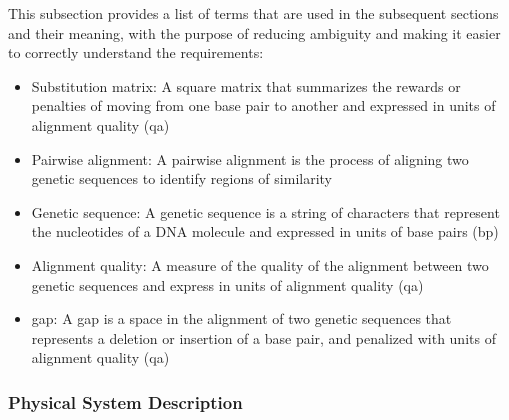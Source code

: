\documentclass[12pt]{article}
\begin{document}
This subsection provides a list of terms that are used in the subsequent
sections and their meaning, with the purpose of reducing ambiguity and making it
easier to correctly understand the requirements:

\begin{itemize}

\item Substitution matrix: A square matrix that summarizes 
the rewards or penalties of moving from one base pair to another and 
expressed in units of alignment quality (qa)
\item Pairwise alignment: A pairwise alignment is the process of aligning two genetic 
sequences to identify regions of similarity 
\item Genetic sequence: A genetic sequence is a string of characters that represent 
the nucleotides of a DNA molecule and expressed in units of base pairs (bp)
\item Alignment quality: A measure of the quality of the alignment between two genetic 
sequences and express in units of alignment quality (qa)
\item gap: A gap is a space in the alignment of two genetic sequences that represents
a deletion or insertion of a base pair, and penalized with units of alignment quality (qa)

\end{itemize}

\subsubsection{Physical System Description} \label{sec_phySystDescrip}

\end{document}
